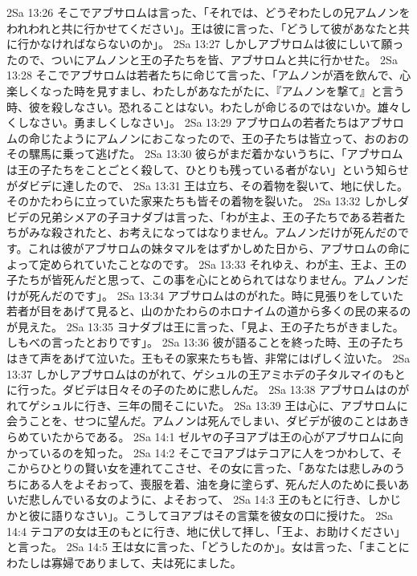 2Sa 13:26  そこでアブサロムは言った、「それでは、どうぞわたしの兄アムノンをわれわれと共に行かせてください」。王は彼に言った、「どうして彼があなたと共に行かなければならないのか」。
2Sa 13:27  しかしアブサロムは彼にしいて願ったので、ついにアムノンと王の子たちを皆、アブサロムと共に行かせた。
2Sa 13:28  そこでアブサロムは若者たちに命じて言った、「アムノンが酒を飲んで、心楽しくなった時を見すまし、わたしがあなたがたに、『アムノンを撃て』と言う時、彼を殺しなさい。恐れることはない。わたしが命じるのではないか。雄々しくしなさい。勇ましくしなさい」。
2Sa 13:29  アブサロムの若者たちはアブサロムの命じたようにアムノンにおこなったので、王の子たちは皆立って、おのおのその騾馬に乗って逃げた。
2Sa 13:30  彼らがまだ着かないうちに、「アブサロムは王の子たちをことごとく殺して、ひとりも残っている者がない」という知らせがダビデに達したので、
2Sa 13:31  王は立ち、その着物を裂いて、地に伏した。そのかたわらに立っていた家来たちも皆その着物を裂いた。
2Sa 13:32  しかしダビデの兄弟シメアの子ヨナダブは言った、「わが主よ、王の子たちである若者たちがみな殺されたと、お考えになってはなりません。アムノンだけが死んだのです。これは彼がアブサロムの妹タマルをはずかしめた日から、アブサロムの命によって定められていたことなのです。
2Sa 13:33  それゆえ、わが主、王よ、王の子たちが皆死んだと思って、この事を心にとめられてはなりません。アムノンだけが死んだのです」。
2Sa 13:34  アブサロムはのがれた。時に見張りをしていた若者が目をあげて見ると、山のかたわらのホロナイムの道から多くの民の来るのが見えた。
2Sa 13:35  ヨナダブは王に言った、「見よ、王の子たちがきました。しもべの言ったとおりです」。
2Sa 13:36  彼が語ることを終った時、王の子たちはきて声をあげて泣いた。王もその家来たちも皆、非常にはげしく泣いた。
2Sa 13:37  しかしアブサロムはのがれて、ゲシュルの王アミホデの子タルマイのもとに行った。ダビデは日々その子のために悲しんだ。
2Sa 13:38  アブサロムはのがれてゲシュルに行き、三年の間そこにいた。
2Sa 13:39  王は心に、アブサロムに会うことを、せつに望んだ。アムノンは死んでしまい、ダビデが彼のことはあきらめていたからである。
2Sa 14:1  ゼルヤの子ヨアブは王の心がアブサロムに向かっているのを知った。
2Sa 14:2  そこでヨアブはテコアに人をつかわして、そこからひとりの賢い女を連れてこさせ、その女に言った、「あなたは悲しみのうちにある人をよそおって、喪服を着、油を身に塗らず、死んだ人のために長いあいだ悲しんでいる女のように、よそおって、
2Sa 14:3  王のもとに行き、しかじかと彼に語りなさい」。こうしてヨアブはその言葉を彼女の口に授けた。
2Sa 14:4  テコアの女は王のもとに行き、地に伏して拝し、「王よ、お助けください」と言った。
2Sa 14:5  王は女に言った、「どうしたのか」。女は言った、「まことにわたしは寡婦でありまして、夫は死にました。
